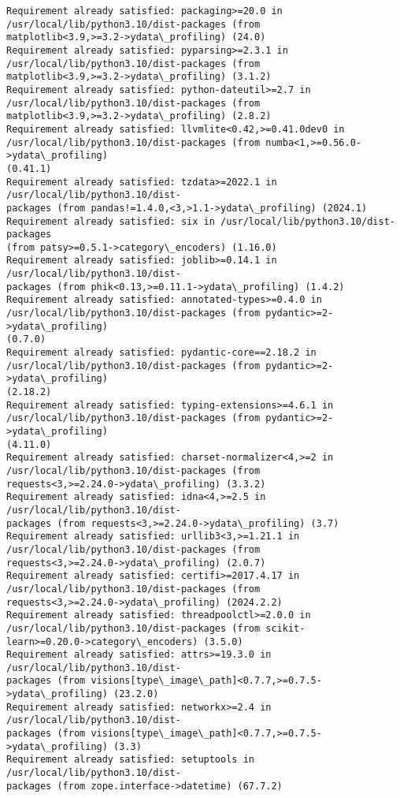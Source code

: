 \documentclass[11pt]{article}
\begin{document}
\begin{Verbatim}[commandchars=\\\{\}]
Requirement already satisfied: packaging>=20.0 in
/usr/local/lib/python3.10/dist-packages (from
matplotlib<3.9,>=3.2->ydata\_profiling) (24.0)
Requirement already satisfied: pyparsing>=2.3.1 in
/usr/local/lib/python3.10/dist-packages (from
matplotlib<3.9,>=3.2->ydata\_profiling) (3.1.2)
Requirement already satisfied: python-dateutil>=2.7 in
/usr/local/lib/python3.10/dist-packages (from
matplotlib<3.9,>=3.2->ydata\_profiling) (2.8.2)
Requirement already satisfied: llvmlite<0.42,>=0.41.0dev0 in
/usr/local/lib/python3.10/dist-packages (from numba<1,>=0.56.0->ydata\_profiling)
(0.41.1)
Requirement already satisfied: tzdata>=2022.1 in /usr/local/lib/python3.10/dist-
packages (from pandas!=1.4.0,<3,>1.1->ydata\_profiling) (2024.1)
Requirement already satisfied: six in /usr/local/lib/python3.10/dist-packages
(from patsy>=0.5.1->category\_encoders) (1.16.0)
Requirement already satisfied: joblib>=0.14.1 in /usr/local/lib/python3.10/dist-
packages (from phik<0.13,>=0.11.1->ydata\_profiling) (1.4.2)
Requirement already satisfied: annotated-types>=0.4.0 in
/usr/local/lib/python3.10/dist-packages (from pydantic>=2->ydata\_profiling)
(0.7.0)
Requirement already satisfied: pydantic-core==2.18.2 in
/usr/local/lib/python3.10/dist-packages (from pydantic>=2->ydata\_profiling)
(2.18.2)
Requirement already satisfied: typing-extensions>=4.6.1 in
/usr/local/lib/python3.10/dist-packages (from pydantic>=2->ydata\_profiling)
(4.11.0)
Requirement already satisfied: charset-normalizer<4,>=2 in
/usr/local/lib/python3.10/dist-packages (from
requests<3,>=2.24.0->ydata\_profiling) (3.3.2)
Requirement already satisfied: idna<4,>=2.5 in /usr/local/lib/python3.10/dist-
packages (from requests<3,>=2.24.0->ydata\_profiling) (3.7)
Requirement already satisfied: urllib3<3,>=1.21.1 in
/usr/local/lib/python3.10/dist-packages (from
requests<3,>=2.24.0->ydata\_profiling) (2.0.7)
Requirement already satisfied: certifi>=2017.4.17 in
/usr/local/lib/python3.10/dist-packages (from
requests<3,>=2.24.0->ydata\_profiling) (2024.2.2)
Requirement already satisfied: threadpoolctl>=2.0.0 in
/usr/local/lib/python3.10/dist-packages (from scikit-
learn>=0.20.0->category\_encoders) (3.5.0)
Requirement already satisfied: attrs>=19.3.0 in /usr/local/lib/python3.10/dist-
packages (from visions[type\_image\_path]<0.7.7,>=0.7.5->ydata\_profiling) (23.2.0)
Requirement already satisfied: networkx>=2.4 in /usr/local/lib/python3.10/dist-
packages (from visions[type\_image\_path]<0.7.7,>=0.7.5->ydata\_profiling) (3.3)
Requirement already satisfied: setuptools in /usr/local/lib/python3.10/dist-
packages (from zope.interface->datetime) (67.7.2)
    \end{Verbatim}
\end{document}
